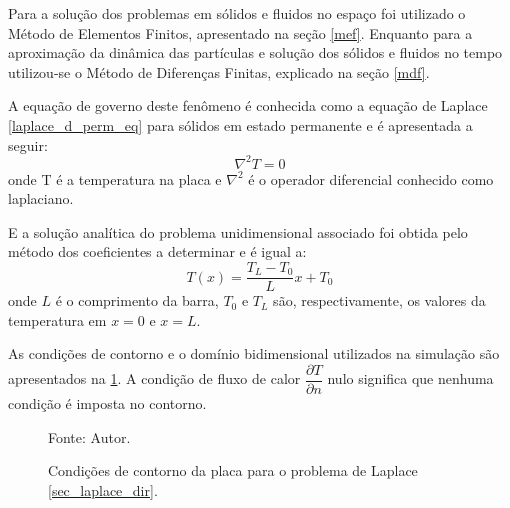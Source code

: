 Para a solução dos problemas em sólidos e fluidos no espaço foi utilizado o Método de Elementos Finitos, apresentado na seção \ref{mef}.
Enquanto para a aproximação da dinâmica das partículas e solução dos sólidos e fluidos no tempo utilizou-se o Método de Diferenças Finitas, explicado na seção \ref{mdf}.

A equação de governo deste fenômeno é conhecida como a equação de Laplace \eqref{laplace_d_perm_eq} para sólidos em estado permanente e é apresentada a seguir:
\begin{equation}
    \nabla^2 T = 0
    \label{laplace_d_perm_eq} 
\end{equation}
onde T é a temperatura na placa e $\nabla^2$ é o operador diferencial conhecido como laplaciano.

E a solução analítica do problema unidimensional associado foi obtida pelo método dos coeficientes a determinar e é igual a:
\begin{equation}
    T(x) = \dfrac{T_L-T_0}{L} x + T_0
    \label{laplace_d_sol}
\end{equation}
onde $L$ é o comprimento da barra, $T_0$ e $T_L$ são, respectivamente, os valores da temperatura em $x=0$ e $x=L$.

As condições de contorno e o domínio bidimensional utilizados na simulação são apresentados na \ref{laplace_d_bc}. A condição de fluxo de calor $\dfrac{\partial T}{\partial n}$ nulo significa que nenhuma condição é imposta no contorno.

\begin{figure}[H]
    \centering
     {\raggedleft \scriptsize Fonte: Autor.}
    \caption{Condições de contorno da placa para o problema de Laplace \ref{sec_laplace_dir}.}
    \label{laplace_d_bc}
\end{figure}

